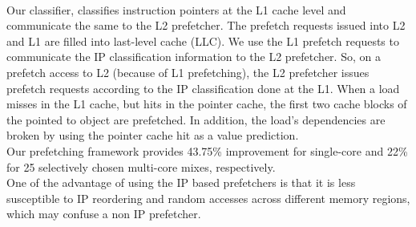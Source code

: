 \documentclass{article}
\begin{document}
\\Our classifier, classifies instruction pointers at the L1 cache level and communicate the same to the L2 prefetcher. The prefetch requests issued into L2 and L1 are filled into last-level cache (LLC). We use the L1 prefetch requests to communicate the IP classification information to the L2 prefetcher. So, on a prefetch access to L2 (because of L1 prefetching), the L2 prefetcher issues prefetch requests according to the IP classification done at the L1. When a load misses in the L1 cache, but hits in the pointer cache, the first two cache blocks of the pointed to object are prefetched. In addition, the load’s dependencies are broken by using the pointer cache hit as a value prediction.
\\Our prefetching framework provides 43.75\% improvement for single-core and 22\% for 25 selectively chosen multi-core mixes, respectively.
\\One of the advantage of using the IP based prefetchers is that it is less susceptible to IP reordering and random accesses across different memory regions, which may confuse a non IP prefetcher.
\end{document}
